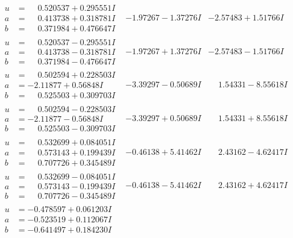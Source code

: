 \documentclass[1p]{elsarticle_modified}
\theoremstyle{definition}
\begin{document}
$$\begin{array}{c|c|c}
\begin{aligned}
u &= \phantom{-}0.520537 + 0.295551 I \\
a &= \phantom{-}0.413738 + 0.318781 I \\
b &= \phantom{-}0.371984 + 0.476647 I\end{aligned}
 & -1.97267 - 1.37276 I & -2.57483 + 1.51766 I \\ \hline\begin{aligned}
u &= \phantom{-}0.520537 - 0.295551 I \\
a &= \phantom{-}0.413738 - 0.318781 I \\
b &= \phantom{-}0.371984 - 0.476647 I\end{aligned}
 & -1.97267 + 1.37276 I & -2.57483 - 1.51766 I \\ \hline\begin{aligned}
u &= \phantom{-}0.502594 + 0.228503 I \\
a &= -2.11877 + 0.56848 I \\
b &= \phantom{-}0.525503 + 0.309703 I\end{aligned}
 & -3.39297 - 0.50689 I & \phantom{-}1.54331 - 8.55618 I \\ \hline\begin{aligned}
u &= \phantom{-}0.502594 - 0.228503 I \\
a &= -2.11877 - 0.56848 I \\
b &= \phantom{-}0.525503 - 0.309703 I\end{aligned}
 & -3.39297 + 0.50689 I & \phantom{-}1.54331 + 8.55618 I \\ \hline\begin{aligned}
u &= \phantom{-}0.532699 + 0.084051 I \\
a &= \phantom{-}0.573143 + 0.199439 I \\
b &= \phantom{-}0.707726 + 0.345489 I\end{aligned}
 & -0.46138 + 5.41462 I & \phantom{-}2.43162 - 4.62417 I \\ \hline\begin{aligned}
u &= \phantom{-}0.532699 - 0.084051 I \\
a &= \phantom{-}0.573143 - 0.199439 I \\
b &= \phantom{-}0.707726 - 0.345489 I\end{aligned}
 & -0.46138 - 5.41462 I & \phantom{-}2.43162 + 4.62417 I \\ \hline\begin{aligned}
u &= -0.478597 + 0.061203 I \\
a &= -0.523519 + 0.112067 I \\
b &= -0.641497 + 0.184230 I\end{aligned}

\end{array}$$
\end{document}
